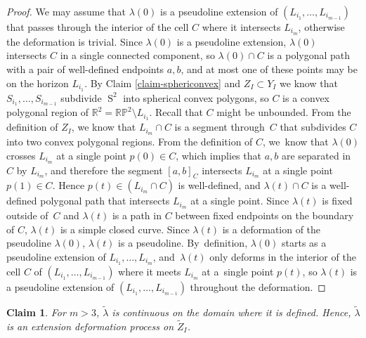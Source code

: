 \documentclass[JEP,XML,SOM,Unicode,NoFloatCountersInSection,published]{cedram}
\newtheorem{claim}[theorem]{Claim}
\theoremstyle{remark}
\let\mb\mathbb
\DeclareMathOperator{\sphere}{S}
\newcommand{\projplane}{\mb{RP}^2}
\begin{document}
\begin{proof}
We may assume that $\lambda(0)$ is a pseudoline extension of $(L_{i_1},\dots,L_{i_{m-1}})$ that passes through the interior of the cell $C$ where it intersects $L_{i_m}$, otherwise the deformation is trivial.
Since $\lambda(0)$ is a pseudoline extension, $\lambda(0)$ intersects $C$ in a single connected component, so $\lambda(0) \cap C$ is a polygonal path with a pair of well-defined endpoints $a,b$, and at most one of these points may be on the horizon $L_{i_1}$.
By Claim \ref{claim-sphericonvex} and $Z_I \subset Y_I$ we know that $S_{i_1},\dots,S_{i_{m-1}}$ subdivide $\sphere^2$ into spherical convex polygons, so $C$ is a convex polygonal region of $\mb{R}^2 = \projplane \setminus L_{i_1}$. Recall that $C$ might be unbounded.
From the definition of $Z_I$, we know that $L_{i_m} \cap C$ is a segment through~$C$ that subdivides $C$ into two convex polygonal regions.
From the definition of $C$, we~know that $\lambda(0)$ crosses $L_{i_m}$ at a single point $p(0) \in C$, which implies that $a,b$ are separated in $C$ by $L_{i_m}$, and therefore the segment $[a,b]_{C}$ intersects $L_{i_m}$ at a single point $p(1) \in C$.
Hence $p(t) \in (L_{i_m} \cap C)$ is well-defined, and $\lambda(t) \cap C$ is a well-defined polygonal path that intersects $L_{i_m}$ at a single point. Since $\lambda(t)$ is fixed outside of~$C$ and $\lambda(t)$ is a path in $C$ between fixed endpoints on the boundary of $C$, $\lambda(t)$ is a simple closed curve. Since $\lambda(t)$ is a deformation of the pseudoline $\lambda(0)$, $\lambda(t)$ is a pseudoline.
By~definition, $\lambda(0)$ starts as a pseudoline extension of $L_{i_1},\dots,L_{i_m}$, and~$\lambda(t)$ only deforms in the interior of the cell $C$ of $(L_{i_1},\dots,L_{i_{m-1}})$ where it meets $L_{i_m}$ at a~single point $p(t)$, so $\lambda(t)$ is a pseudoline extension of $(L_{i_1},\dots,L_{i_{m-1}})$ throughout the deformation.
\end{proof}

\begin{claim}\label{claim-lambda-continuous}
For $m >3$, $\tilde \lambda$ is continuous on the domain where it is defined. Hence, $\tilde \lambda$ is an extension deformation process on $\tilde Z_I$.
\end{claim}
\end{document}
